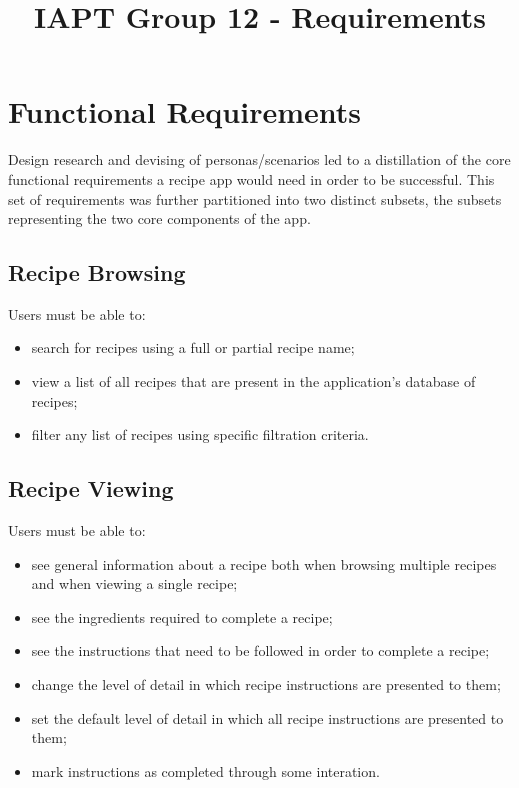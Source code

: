 \documentclass{article}
\title{IAPT Group 12 - Requirements}
\begin{document}
\section{Functional Requirements}
Design research and devising of personas/scenarios led to a distillation of the core functional requirements a recipe app would need in order to be successful. This set of requirements was further partitioned into two distinct subsets, the subsets representing the two core components of the app.

\subsection{Recipe Browsing}
Users must be able to:
\begin{itemize}
\item search for recipes using a full or partial recipe name;
\item view a list of all recipes that are present in the application's database of recipes;
\item filter any list of recipes using specific filtration criteria.
\end{itemize}

\subsection{Recipe Viewing}
Users must be able to:
\begin{itemize}
\item see general information about a recipe both when browsing multiple recipes and when viewing a single recipe;
\item see the ingredients required to complete a recipe;
\item see the instructions that need to be followed in order to complete a recipe;
\item change the level of detail in which recipe instructions are presented to them;
\item set the default level of detail in which all recipe instructions are presented to them;
\item mark instructions as completed through some interation.
\end{itemize}
\end{document}
